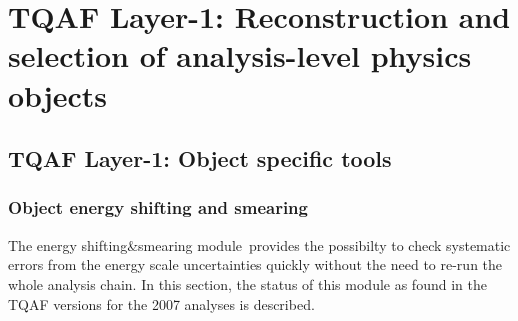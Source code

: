 \documentclass{cmspaper}
\newcommand{\sns}{energy shifting{\&}smearing module}
\begin{document}
 \section{TQAF Layer-1: Reconstruction and selection of analysis-level physics objects}

  \subsection{TQAF Layer-1: Object specific tools} \label{sec:layer1tools}

   \subsubsection{Object energy shifting and smearing} \label{TOOLSSNS}

    The \sns\ provides the possibilty to check systematic errors from the energy scale uncertainties quickly without the need to re-run the whole analysis chain. In this section, the status of this module as found in the TQAF versions for the 2007 analyses is described.
\end{document}
